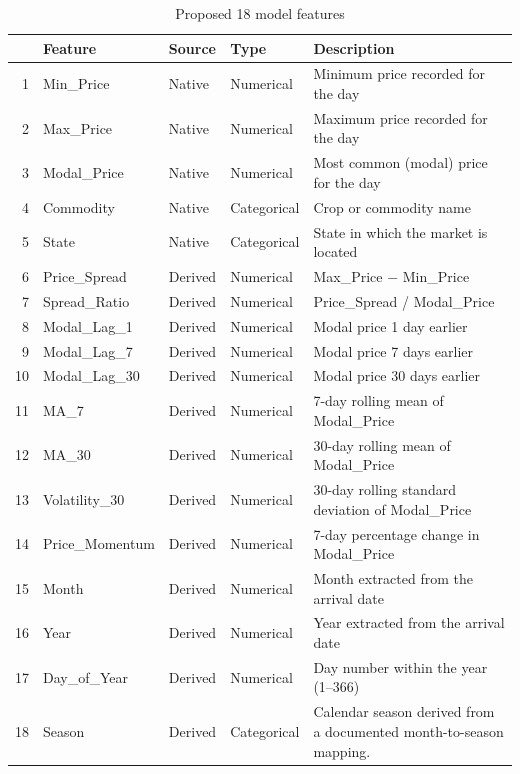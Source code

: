 \documentclass[12pt,a4paper]{article}
\begin{document}
\begin{table}[htbp]
    \centering
    \caption{Proposed 18 model features}
    \label{tab:features}
    \small
    \begin{tabular}{r l l l p{6.2cm}}
        \hline
        & \textbf{Feature} & \textbf{Source} & \textbf{Type} & \textbf{Description} \\
        \hline
        1  & Min\_Price      & Native  & Numerical   & Minimum price recorded for the day \\
        2  & Max\_Price      & Native  & Numerical   & Maximum price recorded for the day \\
        3  & Modal\_Price    & Native  & Numerical   & Most common (modal) price for the day \\
        4  & Commodity       & Native  & Categorical & Crop or commodity name \\
        5  & State           & Native  & Categorical & State in which the market is located \\
        6  & Price\_Spread   & Derived & Numerical   & Max\_Price $-$ Min\_Price \\
        7  & Spread\_Ratio   & Derived & Numerical   & Price\_Spread / Modal\_Price \\
        8  & Modal\_Lag\_1   & Derived & Numerical   & Modal price 1 day earlier \\
        9  & Modal\_Lag\_7   & Derived & Numerical   & Modal price 7 days earlier \\
        10 & Modal\_Lag\_30  & Derived & Numerical   & Modal price 30 days earlier \\
        11 & MA\_7           & Derived & Numerical   & 7-day rolling mean of Modal\_Price \\
        12 & MA\_30          & Derived & Numerical   & 30-day rolling mean of Modal\_Price \\
        13 & Volatility\_30  & Derived & Numerical   & 30-day rolling standard deviation of Modal\_Price \\
        14 & Price\_Momentum & Derived & Numerical   & 7-day percentage change in Modal\_Price \\
        15 & Month           & Derived & Numerical   & Month extracted from the arrival date \\
        16 & Year            & Derived & Numerical   & Year extracted from the arrival date \\
        17 & Day\_of\_Year   & Derived & Numerical   & Day number within the year (1--366) \\
        18 & Season          & Derived & Categorical & Calendar season derived from a documented month-to-season mapping. \\
        \hline
    \end{tabular}
\end{table}
\end{document}
